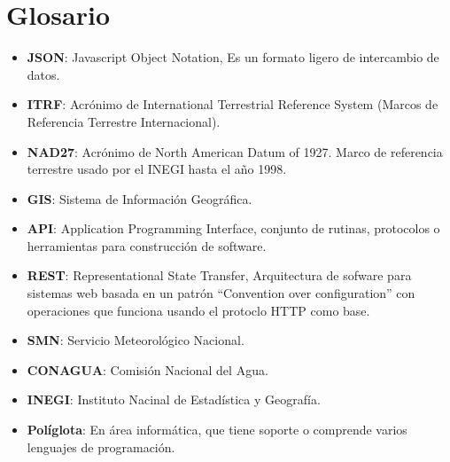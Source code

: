 \newpage
\section*{Glosario}
\begin{itemize}
	\item \textbf{JSON}: Javascript Object Notation, Es un formato ligero de intercambio de datos.
	\item \textbf{ITRF}: Acrónimo de International Terrestrial Reference System (Marcos de Referencia Terrestre Internacional).
	\item \textbf{NAD27}: Acrónimo de North American Datum of 1927. Marco de referencia terrestre usado por el INEGI hasta el año 1998.
	\item \textbf{GIS}: Sistema de Información Geográfica.
  \item \textbf{API}: Application Programming Interface, conjunto de rutinas, protocolos o herramientas para construcción de software.
  \item \textbf{REST}: Representational State Transfer, Arquitectura de sofware para sistemas web basada en un patrón ``Convention over configuration'' con operaciones que funciona usando el protoclo HTTP como base.
  \item \textbf{SMN}: Servicio Meteorológico Nacional.
  \item \textbf{CONAGUA}: Comisión Nacional del Agua.
  \item \textbf{INEGI}: Instituto Nacinal de Estadística y Geografía.
  \item \textbf{Políglota}: En área informática, que tiene soporte o comprende varios lenguajes de programación.
\end{itemize}


